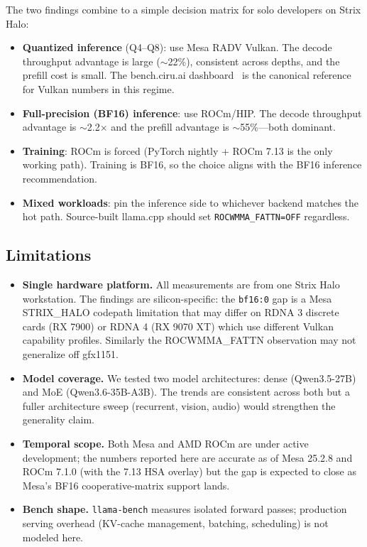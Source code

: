 \documentclass[10pt,a4paper]{article}
\begin{document}
The two findings combine to a simple decision matrix for solo developers on Strix Halo:

\begin{itemize}
  \item \textbf{Quantized inference} (Q4--Q8): use Mesa RADV Vulkan. The decode throughput advantage is large (\(\sim\)22\%), consistent across depths, and the prefill cost is small. The bench.ciru.ai dashboard~\cite{benchciru} is the canonical reference for Vulkan numbers in this regime.
  \item \textbf{Full-precision (BF16) inference}: use ROCm/HIP. The decode throughput advantage is \(\sim\)2.2\(\times\) and the prefill advantage is \(\sim\)55\%---both dominant.
  \item \textbf{Training}: ROCm is forced (PyTorch nightly + ROCm 7.13 is the only working path). Training is BF16, so the choice aligns with the BF16 inference recommendation.
  \item \textbf{Mixed workloads}: pin the inference side to whichever backend matches the hot path. Source-built llama.cpp should set \texttt{ROCWMMA\_FATTN=OFF} regardless.
\end{itemize}

\subsection{Limitations}

\begin{itemize}
  \item \textbf{Single hardware platform.} All measurements are from one Strix Halo workstation. The findings are silicon-specific: the \texttt{bf16:0} gap is a Mesa STRIX\_HALO codepath limitation that may differ on RDNA 3 discrete cards (RX 7900) or RDNA 4 (RX 9070 XT) which use different Vulkan capability profiles. Similarly the ROCWMMA\_FATTN observation may not generalize off gfx1151.
  \item \textbf{Model coverage.} We tested two model architectures: dense (Qwen3.5-27B) and MoE (Qwen3.6-35B-A3B). The trends are consistent across both but a fuller architecture sweep (recurrent, vision, audio) would strengthen the generality claim.
  \item \textbf{Temporal scope.} Both Mesa and AMD ROCm are under active development; the numbers reported here are accurate as of Mesa 25.2.8 and ROCm 7.1.0 (with the 7.13 HSA overlay) but the gap is expected to close as Mesa's BF16 cooperative-matrix support lands.
  \item \textbf{Bench shape.} \texttt{llama-bench} measures isolated forward passes; production serving overhead (KV-cache management, batching, scheduling) is not modeled here.
\end{itemize}
\end{document}
